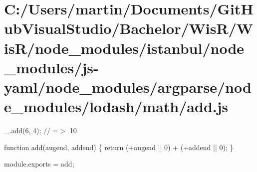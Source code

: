 \hypertarget{_c_1_2_users_2martin_2_documents_2_git_hub_visual_studio_2_bachelor_2_wis_r_2_wis_r_2node_modulee8438e3fcf13464e31691346fce854f1}{}\section{C\+:/\+Users/martin/\+Documents/\+Git\+Hub\+Visual\+Studio/\+Bachelor/\+Wis\+R/\+Wis\+R/node\+\_\+modules/istanbul/node\+\_\+modules/js-\/yaml/node\+\_\+modules/argparse/node\+\_\+modules/lodash/math/add.\+js}
\+\_\+.\+add(6, 4); // =$>$ 10


\begin{DoxyCodeInclude}

\textcolor{keyword}{function} add(augend, addend) \{
  \textcolor{keywordflow}{return} (+augend || 0) + (+addend || 0);
\}

module.exports = add;
\end{DoxyCodeInclude}
 